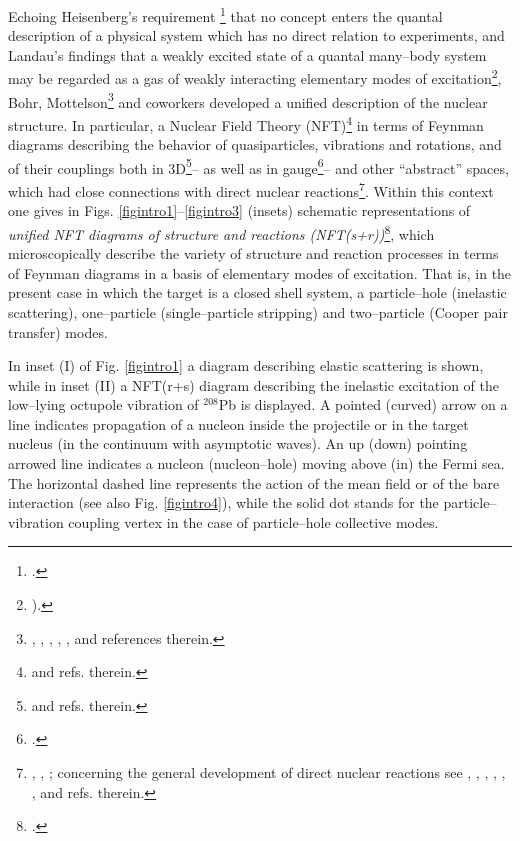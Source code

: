 Echoing Heisenberg's requirement \footnote{\cite{Heisenberg:49}.} that no concept enters the quantal description of a physical system which has no direct relation to experiments, and Landau's findings that a weakly excited state of a quantal many--body system may be regarded as a gas of weakly interacting elementary modes of excitation\footnote{\cite{Landau:41}).}, Bohr, Mottelson\footnote{\cite{Bohr:64}, \cite{Bohr:69}, \cite{Bohr:76}, \cite{Mottelson:76}, \cite{Bohr:75}, \cite{Bohr:58} and references therein.} and coworkers developed a unified description of the nuclear  structure. In particular, a Nuclear Field Theory (NFT)\footnote{\cite{Bes:74,Bohr:75,Bes:90,Mottelson:76} and refs. therein.} in terms of Feynman diagrams describing the behavior of quasiparticles, vibrations and rotations, and of their couplings both in 3D\footnote{\cite{Nilsson:55,Bohr:75} and refs. therein.}-- as well as in gauge\footnote{\cite{Bohr:58,Belyaev:59,Hogassen:61,Bjerregaard:66b,Broglia:67,Bohr:75}.}-- and other ``abstract'' spaces, which had  close connections with direct nuclear reactions\footnote{ \cite{Alder:56}, \cite{Alder:75}, \cite{Broglia:04a}; concerning the general development of direct nuclear reactions see \cite{Austern:70}, \cite{Jackson:70}, \cite{Satchler:80}, \cite{Satchler:83}, \cite{Brink:85}, \cite{Glendenning:04,Thompson:09}, and refs. therein.}. Within this context one gives in Figs. \ref{figintro1}--\ref{figintro3} (insets)  schematic representations of  \textit{unified NFT diagrams of structure and reactions (NFT(s+r))}\footnote{\cite{Broglia:75,Broglia:04a,Potel:13,Broglia:16}.}, which microscopically describe the variety of structure and reaction processes in terms of Feynman diagrams in a basis of elementary modes of excitation. That is, in the present case in which the target is a closed shell system, a particle--hole (inelastic scattering), one--particle (single--particle stripping) and two--particle (Cooper pair transfer) modes. 

In inset (I) of Fig. \ref{figintro1} a diagram describing elastic scattering is shown, while in inset (II) a NFT(r+s) diagram describing the inelastic excitation of the low--lying octupole vibration of $^{208}$Pb is displayed. A pointed (curved) arrow on a line indicates propagation of a nucleon inside the projectile or in the target nucleus (in the continuum with asymptotic waves). An up (down) pointing arrowed line indicates a nucleon (nucleon--hole) moving above (in) the Fermi sea. The horizontal dashed line represents the action of the mean field or of the  bare interaction (see also Fig. \ref{figintro4}), while the solid dot stands for the particle--vibration coupling vertex in the case of particle--hole collective modes. 


